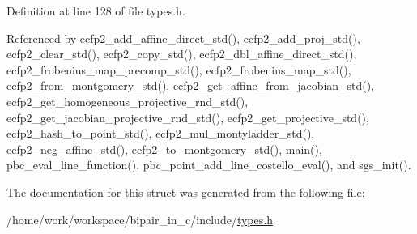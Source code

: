 Definition at line 128 of file types.\-h.



Referenced by ecfp2\-\_\-add\-\_\-affine\-\_\-direct\-\_\-std(), ecfp2\-\_\-add\-\_\-proj\-\_\-std(), ecfp2\-\_\-clear\-\_\-std(), ecfp2\-\_\-copy\-\_\-std(), ecfp2\-\_\-dbl\-\_\-affine\-\_\-direct\-\_\-std(), ecfp2\-\_\-frobenius\-\_\-map\-\_\-precomp\-\_\-std(), ecfp2\-\_\-frobenius\-\_\-map\-\_\-std(), ecfp2\-\_\-from\-\_\-montgomery\-\_\-std(), ecfp2\-\_\-get\-\_\-affine\-\_\-from\-\_\-jacobian\-\_\-std(), ecfp2\-\_\-get\-\_\-homogeneous\-\_\-projective\-\_\-rnd\-\_\-std(), ecfp2\-\_\-get\-\_\-jacobian\-\_\-projective\-\_\-rnd\-\_\-std(), ecfp2\-\_\-get\-\_\-projective\-\_\-std(), ecfp2\-\_\-hash\-\_\-to\-\_\-point\-\_\-std(), ecfp2\-\_\-mul\-\_\-montyladder\-\_\-std(), ecfp2\-\_\-neg\-\_\-affine\-\_\-std(), ecfp2\-\_\-to\-\_\-montgomery\-\_\-std(), main(), pbc\-\_\-eval\-\_\-line\-\_\-function(), pbc\-\_\-point\-\_\-add\-\_\-line\-\_\-costello\-\_\-eval(), and sgs\-\_\-init().



The documentation for this struct was generated from the following file\-:\begin{DoxyCompactItemize}
\item 
/home/work/workspace/bipair\-\_\-in\-\_\-c/include/\hyperlink{types_8h}{types.\-h}\end{DoxyCompactItemize}
